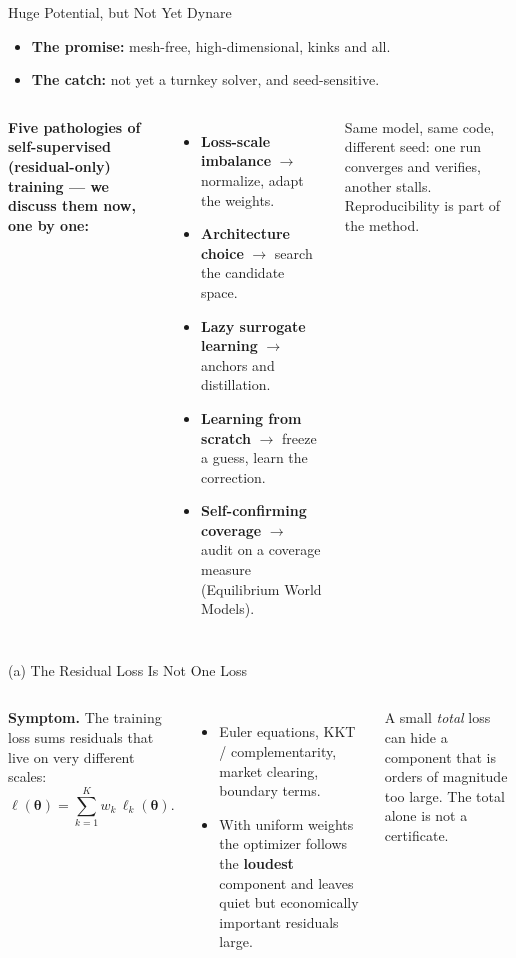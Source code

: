 \documentclass[aspectratio=169,11pt]{beamer}
\newcommand{\lemph}[1]{{\color{uzhblue}\bfseries #1}}
\newcommand{\vemph}[1]{{\color{harvardcrimson}\bfseries #1}}
\newcommand{\param}{{\bm{\theta}}}
\begin{document}
\begin{frame}{Huge Potential, but Not Yet Dynare}
\vspace{0.2em}
\begin{itemize}\setlength\itemsep{4pt}\small
  \item \lemph{The promise:} mesh-free, high-dimensional, kinks and all.
  \item \vemph{The catch:} not yet a turnkey solver, and seed-sensitive.
\end{itemize}
\vspace{0.3em}
\begin{columns}[T,onlytextwidth]
\textbf{\color{uzhblue}Five pathologies of self-supervised (residual-only) training --- we discuss them now, one by one:}
\begin{itemize}\setlength\itemsep{3pt}\footnotesize
  \item[(a)] \vemph{Loss-scale imbalance} $\rightarrow$ normalize, adapt the weights.
  \item[(b)] \vemph{Architecture choice} $\rightarrow$ search the candidate space.
  \item[(c)] \vemph{Lazy surrogate learning} $\rightarrow$ anchors and distillation.
  \item[(d)] \vemph{Learning from scratch} $\rightarrow$ freeze a guess, learn the correction.
  \item[(e)] \vemph{Self-confirming coverage} $\rightarrow$ audit on a coverage
        measure (Equilibrium World Models).
\end{itemize}
\begin{pitfall}
\footnotesize Same model, same code, different seed: one run converges and
verifies, another stalls. Reproducibility is part of the method.
\end{pitfall}
\end{columns}
\end{frame}

\begin{frame}{(a) The Residual Loss Is Not One Loss}
\begin{columns}[T,onlytextwidth]
\textbf{Symptom.} The training loss sums residuals that live on very different
scales:
\[
  \ell(\param)=\sum_{k=1}^{K} w_k\,\ell_k(\param).
\]
{\footnotesize
\begin{itemize}\setlength\itemsep{2pt}
  \item Euler equations, KKT / complementarity, market clearing, boundary terms.
  \item With uniform weights the optimizer follows the \lemph{loudest} component
        and leaves quiet but economically important residuals large.
\end{itemize}}
\begin{pitfall}
\small A small \emph{total} loss can hide a component that is orders of magnitude
too large. The total alone is not a certificate.
\end{pitfall}
\end{columns}
\end{frame}
\end{document}
